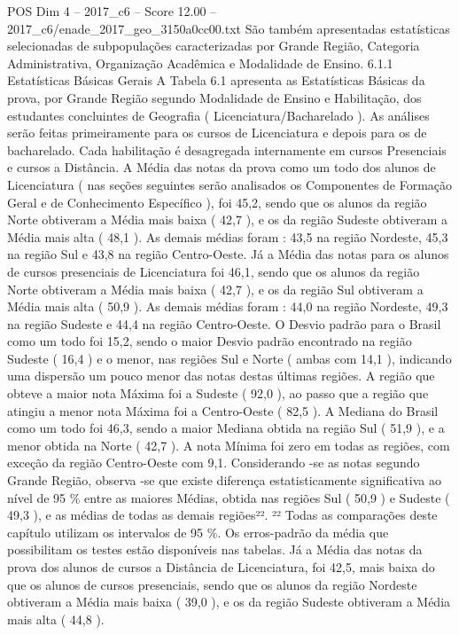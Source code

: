 \begin{textsample}{POS Dim 4 – 2017\_c6 – Score 12.00 – 2017\_c6/enade\_2017\_geo\_3150a0cc00.txt}
São também apresentadas estatísticas selecionadas de subpopulações caracterizadas por Grande Região, Categoria Administrativa, Organização Acadêmica e Modalidade de Ensino. 6.1.1 Estatísticas Básicas Gerais A Tabela 6.1 apresenta as Estatísticas Básicas da prova, por Grande Região segundo Modalidade de Ensino e Habilitação, dos estudantes concluintes de Geografia ( Licenciatura/Bacharelado ).
As análises serão feitas primeiramente para os cursos de Licenciatura e depois para os de bacharelado.
Cada habilitação é desagregada internamente em cursos Presenciais e cursos a Distância.
A Média das notas da prova como um todo dos alunos de Licenciatura ( nas seções seguintes serão analisados os Componentes de Formação Geral e de Conhecimento Específico ), foi 45,2, sendo que os alunos da região Norte obtiveram a Média mais baixa ( 42,7 ), e os da região Sudeste obtiveram a Média mais alta ( 48,1 ).
As demais médias foram : 43,5 na região Nordeste, 45,3 na região Sul e 43,8 na região Centro-Oeste.
Já a Média das notas para os alunos de cursos presenciais de Licenciatura foi 46,1, sendo que os alunos da região Norte obtiveram a Média mais baixa ( 42,7 ), e os da região Sul obtiveram a Média mais alta ( 50,9 ).
As demais médias foram : 44,0 na região Nordeste, 49,3 na região Sudeste e 44,4 na região Centro-Oeste.
O Desvio padrão para o Brasil como um todo foi 15,2, sendo o maior Desvio padrão encontrado na região Sudeste ( 16,4 ) e o menor, nas regiões Sul e Norte ( ambas com 14,1 ), indicando uma dispersão um pouco menor das notas destas últimas regiões.
A região que obteve a maior nota Máxima foi a Sudeste ( 92,0 ), ao passo que a região que atingiu a menor nota Máxima foi a Centro-Oeste ( 82,5 ).
A Mediana do Brasil como um todo foi 46,3, sendo a maior Mediana obtida na região Sul ( 51,9 ), e a menor obtida na Norte ( 42,7 ).
A nota Mínima foi zero em todas as regiões, com exceção da região Centro-Oeste com 9,1.
Considerando -se as notas segundo Grande Região, observa -se que existe diferença estatisticamente significativa ao nível de 95 \% entre as maiores Médias, obtida nas regiões Sul ( 50,9 ) e Sudeste ( 49,3 ), e as médias de todas as demais regiões²². ²² Todas as comparações deste capítulo utilizam os intervalos de 95 \%.
Os erros-padrão da média que possibilitam os testes estão disponíveis nas tabelas.
Já a Média das notas da prova dos alunos de cursos a Distância de Licenciatura, foi 42,5, mais baixa do que os alunos de cursos presenciais, sendo que os alunos da região Nordeste obtiveram a Média mais baixa ( 39,0 ), e os da região Sudeste obtiveram a Média mais alta ( 44,8 ).

\end{textsample}
